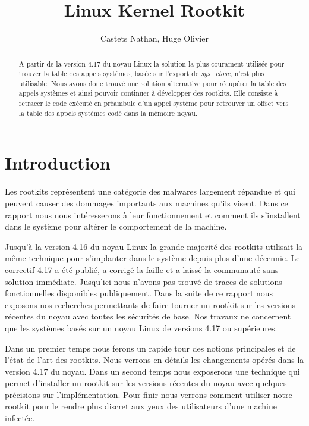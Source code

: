 \documentclass[journal, a4paper]{IEEEtran}
\begin{document}
	\title{Linux Kernel Rootkit}
	\author{Castets Nathan, Huge Olivier}
	\maketitle

\begin{abstract}
A partir de la version 4.17 du noyau Linux la solution la plus courament utilisée pour trouver la table des appels systèmes, basée sur l'export de \textit{sys\_close},  n'est plus utilisable. Nous avons donc trouvé une solution alternative pour récupérer la table des appels systèmes et ainsi pouvoir continuer à développer des rootkits. Elle consiste à retracer le code exécuté en préambule d'un appel système pour retrouver un offset vers la table des appels systèmes codé dans la mémoire noyau.
\end{abstract}

\section{Introduction}

Les rootkits représentent une catégorie des malwares largement répandue et qui peuvent causer des dommages importants aux machines qu'ils visent. Dans ce rapport nous nous intéresserons à leur fonctionnement et comment ils s'installent dans le système pour altérer le comportement de la machine.

Jusqu'à la version 4.16 du noyau Linux la grande majorité des rootkits utilisait la même technique pour s'implanter dans le système depuis plus d'une décennie. Le correctif 4.17 a été publié, a corrigé la faille et a laissé la communauté sans solution immédiate. Jusqu'ici nous n'avons pas trouvé de traces de solutions fonctionnelles disponibles publiquement. Dans la suite de ce rapport nous exposons nos recherches permettants de faire tourner un rootkit sur les versions récentes du noyau avec toutes les sécurités de base. Nos travaux ne concernent que les systèmes basés sur un noyau Linux de versions 4.17 ou supérieures.

Dans un premier temps nous ferons un rapide tour des notions principales et de l'état de l'art des rootkits. Nous verrons en détails les changements opérés dans la version 4.17 du noyau.
Dans un second temps nous exposerons une technique qui permet d'installer un rootkit sur les versions récentes du noyau avec quelques précisions sur l'implémentation.
Pour finir nous verrons comment utiliser notre rootkit pour le rendre plus discret aux yeux des utilisateurs d'une machine infectée.
\end{document}
